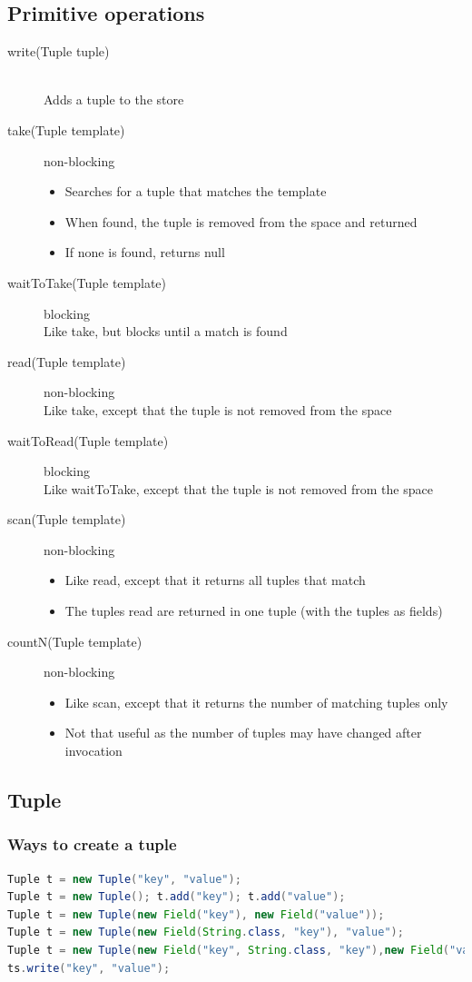 \documentclass[10pt]{article}
\begin{document}
\subsection{Primitive operations}
\begin{description}
	\item[write(Tuple tuple)] \hfill \\ Adds a tuple to the store
	\item[take(Tuple template)] non-blocking \hfill
		\begin{itemize}
			\item Searches for a tuple that matches the template
			\item When found, the tuple is removed from the space and returned
			\item If none is found, returns null
		\end{itemize}
	\item[waitToTake(Tuple template)] blocking \hfill \\
		Like take, but blocks until a match is found
	\item[read(Tuple template)] non-blocking \hfill \\
		 Like take, except that the tuple is not removed from the space
	\item[waitToRead(Tuple template)] blocking \hfill \\
		Like waitToTake, except that the tuple is not removed from the space
	\item[scan(Tuple template)] non-blocking \hfill
		\begin{itemize}
			\item Like read, except that it returns all tuples that match
			\item The tuples read are returned in one tuple (with the tuples as fields)	
		\end{itemize}
	\item[countN(Tuple template)] non-blocking \hfill
		\begin{itemize}
			\item Like scan, except that it returns the number of matching tuples only
			\item Not that useful as the number of tuples may have changed after invocation
		\end{itemize}
\end{description}
\subsection{Tuple}
\subsubsection{Ways to create a tuple}
\begin{lstlisting}[language=Java, caption=Ways to create a tuple, style=JavaStyle]
Tuple t = new Tuple("key", "value");
Tuple t = new Tuple(); t.add("key"); t.add("value");
Tuple t = new Tuple(new Field("key"), new Field("value"));
Tuple t = new Tuple(new Field(String.class, "key"), "value");
Tuple t = new Tuple(new Field("key", String.class, "key"),new Field("value", String.class, "value"));
ts.write("key", "value");
\end{lstlisting}
\end{document}
